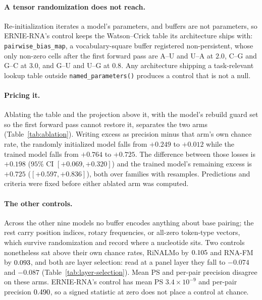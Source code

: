 \documentclass{article}
\begin{document}
\paragraph{A tensor randomization does not reach.} Re-initialization iterates a
model's parameters, and buffers are not parameters, so ERNIE-RNA's control keeps
the Watson--Crick table its architecture ships with:
\texttt{pairwise\_bias\_map}, a vocabulary-square buffer registered
non-persistent, whose only non-zero cells after the first forward pass are A--U
and U--A at $2.0$, C--G and G--C at $3.0$, and G--U and U--G at $0.8$. Any
architecture shipping a task-relevant lookup table outside
\texttt{named\_parameters()} produces a control that is not a null.



\paragraph{Pricing it.} Ablating the table and the projection above it, with the
model's rebuild guard set so the first forward pass cannot restore it, separates
the two arms (Table~\ref{tab:ablation}). Writing excess as precision minus that
arm's own chance rate, the randomly initialized model falls from $+0.249$ to
$+0.012$ while the trained model falls from $+0.764$ to $+0.725$. The difference
between those losses is $+0.198$ ($95\%$ CI $[+0.069, +0.320]$) and the trained
model's remaining excess is $+0.725$ ($[+0.597, +0.836]$), both over
\chanceRateN{} families with \bootstrapB{} resamples. Predictions and criteria
were fixed before either ablated arm was computed.

\paragraph{The other controls.} Across the other nine models no buffer encodes
anything about base pairing; the rest carry position indices, rotary
frequencies, or all-zero token-type vectors, which survive randomization and
record where a nucleotide sits. Two controls nonetheless sat above their own
chance rates, RiNALMo by $0.105{}$ and RNA-FM by
$0.093{}$, and both are layer
selection: read at a panel layer they fall to $-0.074$ and $-0.087$
(Table~\ref{tab:layer-selection}). Mean PS and per-pair precision disagree on
these arms. ERNIE-RNA's control has mean PS $3.4 \times 10^{-9}$ and per-pair
precision $0.490{}$, so a signed statistic at zero
does not place a control at
chance.
\end{document}
